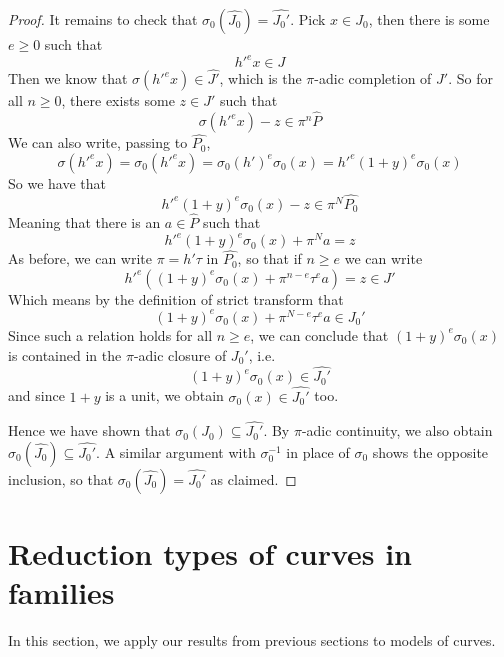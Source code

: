 \documentclass{article}
\theoremstyle{definition}
\theoremstyle{plain}
\theoremstyle{remark}
\newcommand{\comp}[1]{\widehat{#1}}
\begin{document}
\begin{proof}
		It remains to check that $\sigma_0(\comp{J_0}) = \comp{J_0'}$. Pick $x\in J_0$, then there is some $e\ge 0$ such that
		\[h'^ex \in J\]
		Then we know that $\sigma(h'^ex)\in \comp{J'}$, which is the $\pi$-adic completion of $J'$. So for all $n\ge 0$, there exists some $z\in J'$ such that
		\[\sigma(h'^ex) -z \in \pi^n\comp{P}\]
		We can also write, passing to $\comp{P_0}$,
		\[\sigma(h'^e x) = \sigma_0(h'^e x) = \sigma_0(h')^e\sigma_0(x) = h'^e(1+y)^e\sigma_0(x)\]
		So we have that
		\[h'^e(1+y)^e\sigma_0(x)-z\in \pi^N\comp{P_0}\]
		Meaning that there is an $a\in \comp{P}$ such that
		\[h'^e(1+y)^e\sigma_0(x) + \pi^N a = z\]
		As before, we can write $\pi = h'\tau$ in $\comp{P_0}$, so that if $n\ge e$ we can write
		\[h'^e((1+y)^e\sigma_0(x) + \pi^{n-e}\tau^e a) = z \in J'\]
		Which means by the definition of strict transform that
		\[(1+y)^e\sigma_0(x) + \pi^{N-e}\tau^ea \in J_0'\]
		Since such a relation holds for all $n\ge e$, we can conclude that $(1+y)^e\sigma_0(x)$ is contained in the $\pi$-adic closure of $J_0'$, i.e.
		\[(1+y)^e\sigma_0(x)\in \comp{J_0'}\]
		and since $1+y$ is a unit, we obtain $\sigma_0(x)\in \comp{J_0'}$ too.
		
		Hence we have shown that $\sigma_0(J_0) \subseteq \comp{J_0'}$. By $\pi$-adic continuity, we also obtain $\sigma_0(\comp{J_0})\subseteq \comp{J_0'}$. A similar argument with $\sigma_0^{-1}$ in place of $\sigma_0$ shows the opposite inclusion, so that $\sigma_0(\comp{J_0}) = \comp{J_0'}$ as claimed.	
	\end{proof}
	\section{Reduction types of curves in families}\label{section_results}
	
	In this section, we apply our results from previous sections to models of curves.
\end{document}
